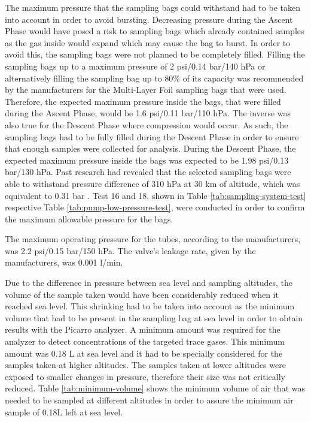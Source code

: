 %
The maximum pressure that the sampling bags could withstand had to be taken into account in order to avoid bursting. Decreasing pressure during the Ascent Phase would have posed a risk to sampling bags which already contained samples as the gas inside would expand which may cause the bag to burst. In order to avoid this, the sampling bags were not planned to be completely filled. Filling the sampling bags up to a maximum pressure of 2 psi/0.14 bar/140 hPa or alternatively filling the sampling bag up to 80\% of its capacity  was recommended by the manufacturers for the Multi-Layer Foil sampling bags that were used. Therefore, the expected maximum pressure inside the bags, that were filled during the Ascent Phase, would be 1.6 psi/0.11 bar/110 hPa. The inverse was also true for the Descent Phase where compression would occur. As such, the sampling bags had to be fully filled during the Descent Phase in order to ensure that enough samples were collected for analysis. During the Descent Phase, the expected maximum pressure inside the bags was expected to be 1.98 psi/0.13 bar/130 hPa. Past research had revealed that the selected sampling bags were able to withstand pressure difference of 310 hPa at 30 km of altitude, which was equivalent to 0.31 bar \cite{LISA}. Test 16 and 18, shown in Table \ref{tab:sampling-system-test} respective Table \ref{tab:pump-low-pressure-test},  were conducted in order to confirm the maximum allowable pressure for the bags.

The maximum operating pressure for the tubes, according to the manufacturers, was 2.2 psi/0.15 bar/150 hPa. The valve's leakage rate, given by the manufacturers, was 0.001 l/min.     


Due to the difference in pressure between sea level and sampling altitudes, the volume of the sample taken would have been considerably reduced when it reached sea level. This shrinking had to be taken into account as the minimum volume that had to be present in the sampling bag at sea level in order to obtain results with the Picarro analyzer. A minimum amount was required for the analyzer to detect concentrations of the targeted trace gases. This minimum amount was 0.18 L at sea level and it had to be specially considered for the samples taken at higher altitudes. The samples taken at lower altitudes were exposed to smaller changes in pressure, therefore their size was not critically reduced. Table \ref{tab:minimum-volume} shows the minimum volume of air that was needed to be sampled at different altitudes in order to assure the minimum air sample of 0.18L left at sea level. \\

